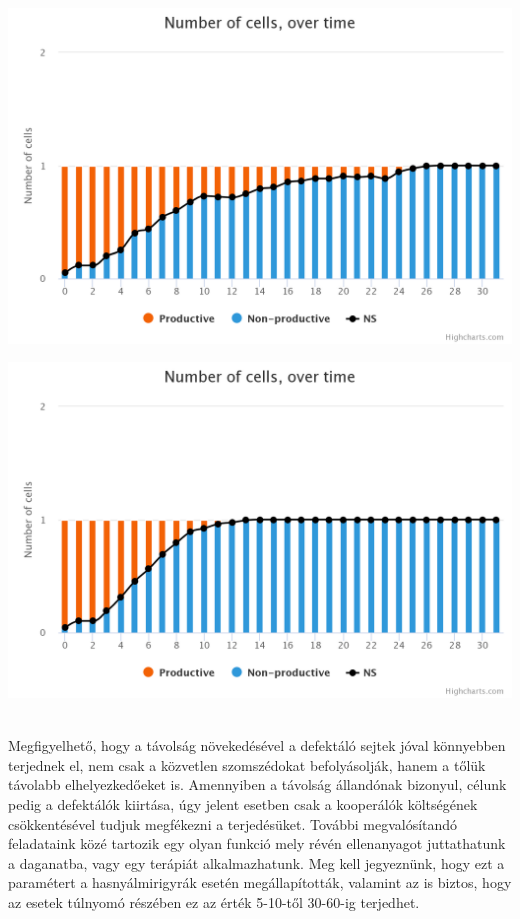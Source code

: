 \begin{minipage}{\linewidth}
	\centering
	\begin{multicols}{2}
		\begin{Figure}
			\centering
			\includegraphics[width=\linewidth]{images/diffdist2}
		\end{Figure}
		\begin{Figure}
			\centering
			\includegraphics[width=\linewidth]{images/diffdist5}
		\end{Figure}
	\end{multicols}
\end{minipage}\\

Megfigyelhető, hogy a távolság növekedésével a defektáló sejtek jóval könnyebben terjednek el, nem csak a közvetlen szomszédokat befolyásolják, hanem a tőlük távolabb elhelyezkedőeket is. Amennyiben a távolság állandónak bizonyul, célunk pedig a defektálók kiirtása, úgy jelent esetben csak a kooperálók költségének csökkentésével tudjuk megfékezni a terjedésüket. További megvalósítandó feladataink közé tartozik egy olyan funkció mely révén ellenanyagot juttathatunk a daganatba, vagy egy terápiát alkalmazhatunk.
Meg kell jegyeznünk, hogy ezt a paramétert a hasnyálmirigyrák esetén megállapították\cite{archetti2015heterogeneity}, valamint az is biztos, hogy az esetek túlnyomó részében ez az érték 5-10-től 30-60-ig terjedhet\cite{archetti2016cooperation}.

